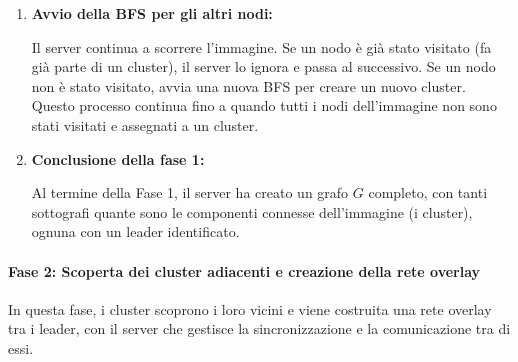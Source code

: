 \documentclass[12pt, a4paper]{report}
\begin{document}
\begin{enumerate}
    Alla fine di ogni BFS, il nodo leader del cluster invia un messaggio al server con le seguenti informazioni:
    \begin{itemize}
        \item \texttt{leaderID}: l'identificatore del leader del cluster.
        \item \texttt{color}: il colore del cluster.
    \end{itemize}

    Il server registra queste informazioni e costruisce progressivamente il grafo $G$, che ha come nodo radice il server stesso e come sottografi i cluster rappresentati dai rispettivi leader. Ogni cluster \`e dunque un sottografo di $G$ con il leader come nodo radice del sottografo.

    \item \textbf{Avvio della BFS per gli altri nodi:}

    Il server continua a scorrere l'immagine. Se un nodo \`e gi\`a stato visitato (fa gi\`a parte di un cluster), il server lo ignora e passa al successivo. Se un nodo non \`e stato visitato, avvia una nuova BFS per creare un nuovo cluster. Questo processo continua fino a quando tutti i nodi dell'immagine non sono stati visitati e assegnati a un cluster.

    \item \textbf{Conclusione della fase 1:}

    Al termine della Fase 1, il server ha creato un grafo $G$ completo, con tanti sottografi quante sono le componenti connesse dell'immagine (i cluster), ognuna con un leader identificato.
    
\end{enumerate}

\paragraph{Fase 2: Scoperta dei cluster adiacenti e creazione della rete overlay}

In questa fase, i cluster scoprono i loro vicini e viene costruita una rete overlay tra i leader, con il server che gestisce la sincronizzazione e la comunicazione tra di essi.
\end{document}
